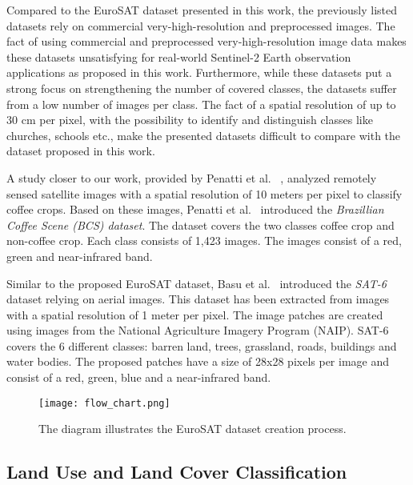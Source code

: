 \documentclass[journal]{IEEEtran}
\begin{document}
Compared to the EuroSAT dataset presented in this work, the previously listed datasets rely on commercial very-high-resolution and preprocessed images. The fact of using commercial and preprocessed very-high-resolution image data makes these datasets unsatisfying for real-world Sentinel-2 Earth observation applications as proposed in this work. Furthermore, while these datasets put a strong focus on strengthening the number of covered classes, the datasets suffer from a low number of images per class. The fact of a spatial resolution of up to 30 cm per pixel, with the possibility to identify and distinguish classes like churches, schools etc., make the presented datasets difficult to compare with the dataset proposed in this work.


A study closer to our work, provided by Penatti et al. ~\cite{penatti2015deep}, analyzed remotely sensed satellite images with a spatial resolution of 10 meters per pixel to classify coffee crops. Based on these images, Penatti et al.~\cite{penatti2015deep} introduced the \textit{Brazillian Coffee Scene (BCS) dataset}. The dataset covers the two classes coffee crop and non-coffee crop. Each class consists of 1,423 images. The images consist of a red, green and near-infrared band. 

Similar to the proposed EuroSAT dataset, Basu et al.~\cite{basu2015deepsat} introduced the \textit{SAT-6} dataset relying on aerial images. This dataset has been extracted from images with a spatial resolution of 1 meter per pixel. The image patches are created using images from the National Agriculture Imagery Program (NAIP). SAT-6 covers the 6 different classes: barren land, trees, grassland, roads, buildings and water bodies. The proposed patches have a size of 28x28 pixels per image and consist of a red, green, blue and a near-infrared band.


\begin{figure}[t!]
	\centering
	\texttt{[image: flow\_chart.png]}
	\caption{The diagram illustrates the EuroSAT dataset creation process.}
	\label{fig:flow_chart}
\end{figure}

\subsection{Land Use and Land Cover Classification}
\end{document}

